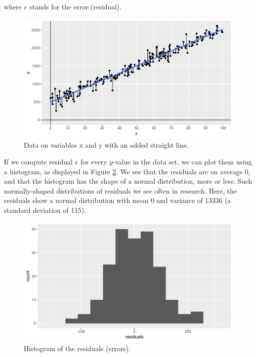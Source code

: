 \documentclass[]{book}\usepackage[]{graphicx}\usepackage[]{color}
\makeatletter
\def\maxwidth{ %
  \ifdim\Gin@nat@width>\linewidth
    \linewidth
  \else
    \Gin@nat@width
  \fi
}
\newenvironment{knitrout}{}{} %
\makeatother
\begin{document}
where $e$ stands for the error (residual).


\begin{knitrout}
\color{fgcolor}\begin{figure}

{\centering \includegraphics[width=\maxwidth]{figure/lm_10-1} 

}

\caption[Data on variables x and y with an added straight line]{Data on variables x and y with an added straight line.}\label{fig:lm_10}
\end{figure}


\end{knitrout}

If we compute residual $e$ for every $y$-value in the data set, we can plot them using a histogram, as displayed in Figure \ref{fig:lm_11}. We see that the residuals are on average 0, and that the histogram has the shape of a normal distribution, more or less. Such normally-shaped distributions of residuals we see often in research. Here, the residuals show a normal distribution with mean 0 and variance of 13336 (a standard deviation of 115).


\begin{knitrout}
\color{fgcolor}\begin{figure}

{\centering \includegraphics[width=\maxwidth]{figure/lm_11-1} 

}

\caption[Histogram of the residuals (errors)]{Histogram of the residuals (errors).}\label{fig:lm_11}
\end{figure}


\end{knitrout}
\end{document}
